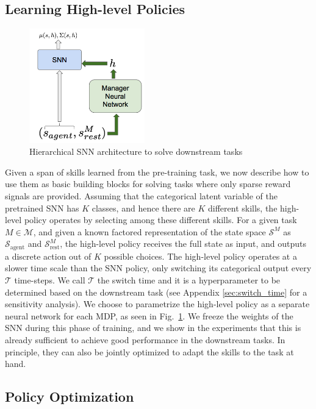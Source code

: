 \documentclass{article} %
\newcommand{\sset}{\mathcal{S}}
\newcommand{\mdpset}{\mathcal{M}}
\newcommand{\agent}{\mathrm{agent}}
\begin{document}
\subsection{Learning High-level Policies}
\label{section:method:highlevel}

\begin{figure}
\includegraphics[width = 5cm]{Figures/hierarchical-SNN.png}
\caption{Hierarchical SNN architecture to solve downstream tasks}
\label{fig:hierarchical_snn_architecture}
\end{figure}

Given a span of skills learned from the pre-training task, we now describe how to use them as basic building blocks for solving tasks where only sparse reward signals are provided. Assuming that the categorical latent variable of the pretrained SNN has $K$ classes, and hence there are $K$ different skills, the high-level policy operates by selecting among these different skills. For a given task $M \in \mdpset$, and given a known factored representation of the state space $\sset^M$ as $\sset_\agent$ and $\sset_{\mathrm{rest}}^M$, the high-level policy receives the full state as input, and outputs a discrete action out of $K$ possible choices. The high-level policy operates at a slower time scale than the SNN policy, only switching its categorical output every $\mathcal{T}$ time-steps. We call $\mathcal{T}$ the switch time and it is a hyperparameter to be determined based on the downstream task (see Appendix \ref{sec:switch_time} for a sensitivity analysis). We choose to parametrize the high-level policy as a separate neural network for each MDP, as seen in Fig.\ \ref{fig:hierarchical_snn_architecture}. We freeze the weights of the SNN during this phase of training, and we show in the experiments that this is already sufficient to achieve good performance in the downstream tasks. In principle, they can also be jointly optimized to adapt the skills to the task at hand.  


\subsection{Policy Optimization}
\label{section:method:polopt}
\end{document}
